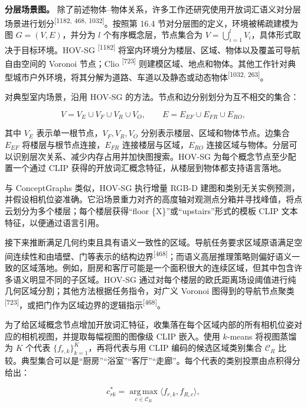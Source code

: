 \textbf{分层场景图。} 除了前述物体--物体关系，许多工作还研究使用开放词汇语义对分层场景进行划分\textsuperscript{[1182, 468, 1032]}。按照第 16.4 节对分层图的定义，环境被稀疏建模为图 $G=(V,E)$，并分为 $l$ 个有序概念层，节点集合为 $V=\bigcup_{i=1}^{l}V_i$，具体形式取决于目标环境。HOV-SG \textsuperscript{[1182]} 将室内环境分为楼层、区域、物体以及覆盖可导航自由空间的 Voronoi 节点；Clio \textsuperscript{[723]} 则建模区域、地点和物体。其他工作针对典型城市户外环境，将其分解为道路、车道以及静态或动态物体\textsuperscript{[1032, 263]}。

对典型室内场景，沿用 HOV-SG 的方法。节点和边分别划分为互不相交的集合：

\begin{equation}
V=V_E\cup V_F\cup V_R\cup V_O,\qquad E=E_{EF}\cup E_{FR}\cup E_{RO},\tag{17.5}
\end{equation}

其中 $V_E$ 表示单一根节点，$V_F,V_R,V_O$ 分别表示楼层、区域和物体节点。边集合 $E_{EF}$ 将楼层与根节点连接，$E_{FR}$ 连接楼层与区域，$E_{RO}$ 连接区域与物体。分层可以识别层次关系、减少内存占用并加快图搜索。HOV-SG 为每个概念节点至少配置一个通过 CLIP 获得的开放词汇概念特征，从楼层到物体都支持语言落地。

与 ConceptGraphs 类似，HOV-SG 执行增量 RGB-D 建图和类别无关实例预测，并假设相机位姿准确。它沿场景重力对齐的高度轴对观测点分箱并寻找峰值，将点云划分为多个楼层；每个楼层获得“floor \{X\}”或“upstairs”形式的模板 CLIP 文本特征，以便通过语言引用。

接下来推断满足几何约束且具有语义一致性的区域。导航任务要求区域原语满足空间连续性和由墙壁、门等表示的结构边界\textsuperscript{[468]}；而语义高层推理策略则偏好语义一致的区域落地。例如，厨房和客厅可能是一个面积很大的连续区域，但其中包含许多语义明显不同的子区域。HOV-SG 通过对每个楼层的欧氏距离场设阈值进行纯几何区域分割；其他方法根据任务指令，对广义 Voronoi 图得到的导航节点聚类\textsuperscript{[723]}，或把门作为区域边界的逻辑指示\textsuperscript{[468]}。

为了给区域概念节点增加开放词汇特征，收集落在每个区域内部的所有相机位姿对应的相机视图，并提取每幅视图的图像级 CLIP 嵌入。使用 $k$-means 将视图蒸馏为 $K$ 个代表 $\{f_{r,k}\}_{k=1}^{K}$，再将代表与用 CLIP 编码的候选区域类别集合 $\mathcal{C}_R$ 比较。典型集合可以是“厨房”“浴室”“客厅”“走廊”。每个代表的类别投票由点积得分给出：

\begin{equation}
c^*_{rk}=\operatorname*{arg\,max}_{c\in\mathcal{C}_R}\langle f_{r,k},f_{R,c}\rangle,\tag{17.6}
\end{equation}

